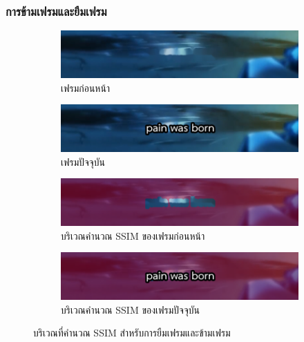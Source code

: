 \documentclass[xcolor=dvipsnames, xetex,serif]{beamer}
\numberwithin{equation}{section}
\begin{document}
		\begin{frame}
			\frametitle{การข้ามเฟรมและยืมเฟรม}
			\begin{figure}[H]
				\centering
				\begin{subfigure}{0.4\linewidth}
					\centering
					\includegraphics[width=0.95\linewidth]{images/skipborrow/prevframe.png}
					\caption{เฟรมก่อนหน้า}
					\label{image:ssim_location_prev}
				\end{subfigure}
				\begin{subfigure}{0.4\linewidth}
					\centering
					\includegraphics[width=0.95\linewidth]{images/skipborrow/currentframe.png}
					\caption{เฟรมปัจจุบัน}
					\label{image:ssim_location_curr}
				\end{subfigure}
				\bigskip
				\begin{subfigure}{0.4\linewidth}
					\centering
					\includegraphics[width=0.95\linewidth]{images/skipborrow/prevframeinverse.png}
					\caption{บริเวณคำนวณ SSIM ของเฟรมก่อนหน้า}
					\label{image:ssim_location_prev_inv}
				\end{subfigure}
				\begin{subfigure}{0.4\linewidth}
					\centering
					\includegraphics[width=0.95\linewidth]{images/skipborrow/currentframeinverse.png}
					\caption{บริเวณคำนวณ SSIM ของเฟรมปัจจุบัน}
					\label{image:ssim_location_curr_inv}
				\end{subfigure}
				\caption{บริเวณที่คำนวณ SSIM สำหรับการยืมเฟรมและข้ามเฟรม}
				\label{image:ssim_location}
			\end{figure}
		\end{frame}
\end{document}
